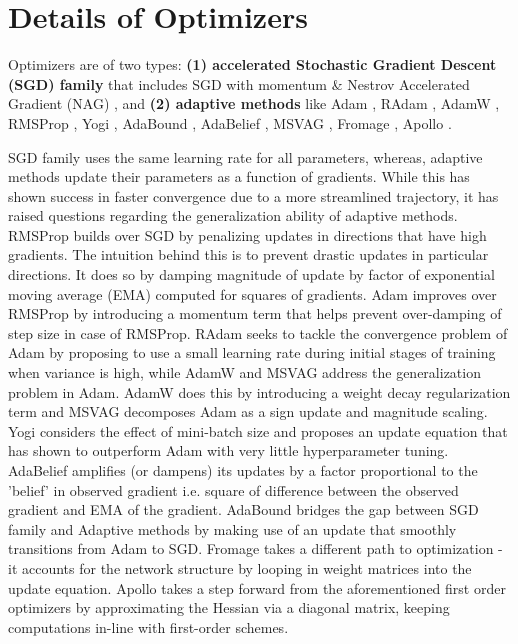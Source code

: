 \section{Details of Optimizers}
Optimizers are of two types: \textbf{(1) accelerated Stochastic Gradient Descent (SGD) family} \cite{SGD} that includes SGD with momentum \cite{Momentum} \& Nestrov Accelerated Gradient (NAG) \cite{NAG}, and \textbf{(2) adaptive methods} like Adam \cite{Adam}, RAdam \cite{liu_variance_2020}, AdamW \cite{AdamW}, RMSProp \cite{RMSProp}, Yogi \cite{Yogi}, AdaBound \cite{AdaBound}, AdaBelief \cite{zhuang_adabelief_2020}, MSVAG \cite{MSVAG}, Fromage \cite{Fromage}, Apollo \cite{Apollo}.

SGD \cite{SGD} family uses the same learning rate for all parameters, whereas, adaptive methods update their parameters as a function of gradients. While this has shown success in faster convergence due to a more streamlined trajectory, it has raised questions regarding the generalization ability of adaptive methods. RMSProp \cite{RMSProp} builds over SGD by penalizing updates in directions that have high gradients. The intuition behind this is to prevent drastic updates in particular directions. It does so by damping magnitude of update by factor of exponential moving average (EMA) computed for squares of gradients. Adam \cite{Adam} improves over RMSProp by introducing a momentum term that helps prevent over-damping of step size in case of RMSProp. RAdam \cite{liu_variance_2020} seeks to tackle the convergence problem of Adam by proposing to use a small learning rate during initial stages of training when variance is high, while AdamW \cite{AdamW} and MSVAG \cite{MSVAG} address the generalization problem in Adam. AdamW does this by introducing a weight decay regularization term and MSVAG decomposes Adam as a sign update and magnitude scaling. Yogi \cite{Yogi} considers the effect of mini-batch size and proposes an update equation that has shown to outperform Adam with very little hyperparameter tuning. AdaBelief \cite{zhuang_adabelief_2020} amplifies (or dampens) its updates by a factor proportional to the 'belief' in observed gradient i.e. square of difference between the observed gradient and EMA of the gradient. AdaBound \cite{AdaBound} bridges the gap between SGD family and Adaptive methods by making use of an update that smoothly transitions from Adam to SGD. Fromage \cite{Fromage} takes a different path to optimization - it accounts for the network structure by looping in weight matrices into the update equation. Apollo \cite{Apollo} takes a step forward from the aforementioned first order optimizers by approximating the Hessian via a diagonal matrix, keeping computations in-line with first-order schemes.


